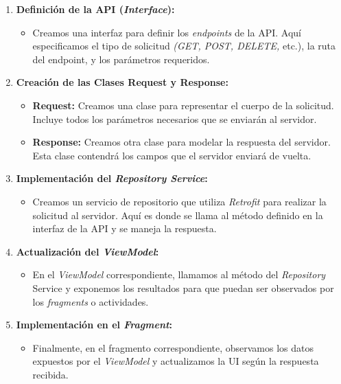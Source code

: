 \begin{enumerate}
    \item \textbf{Definición de la API (\textit{Interface}):}
    
    \begin{itemize}
        \item Creamos una interfaz para definir los \textit{endpoints} de la API. Aquí especificamos el tipo de solicitud \textit{(GET, POST, DELETE,} etc.), la ruta del endpoint, y los parámetros requeridos.
    \end{itemize}

    \item \textbf{Creación de las Clases Request y Response:}
    \begin{itemize}
        \item \textbf{Request:} Creamos una clase para representar el cuerpo de la solicitud. Incluye todos los parámetros necesarios que se enviarán al servidor.
        \item \textbf{Response:} Creamos otra clase para modelar la respuesta del servidor. Esta clase contendrá los campos que el servidor enviará de vuelta.

    \end{itemize}

    \item \textbf{Implementación del \textit{Repository Service}:}
    \begin{itemize}
        \item Creamos un servicio de repositorio que utiliza \textit{Retrofit} para realizar la solicitud al servidor. Aquí es donde se llama al método definido en la interfaz de la API y se maneja la respuesta.

    \end{itemize}

    \item \textbf{Actualización del \textit{ViewModel}:}
    \begin{itemize}
        \item En el \textit{ViewModel} correspondiente, llamamos al método del \textit{Repository} Service y exponemos los resultados para que puedan ser observados por los \textit{fragments} o actividades.

    \end{itemize}

    \item \textbf{Implementación en el \textit{Fragment}:}
    \begin{itemize}
        \item Finalmente, en el fragmento correspondiente, observamos los datos expuestos por el \textit{ViewModel} y actualizamos la UI según la respuesta recibida.

    \end{itemize}
\end{enumerate}

